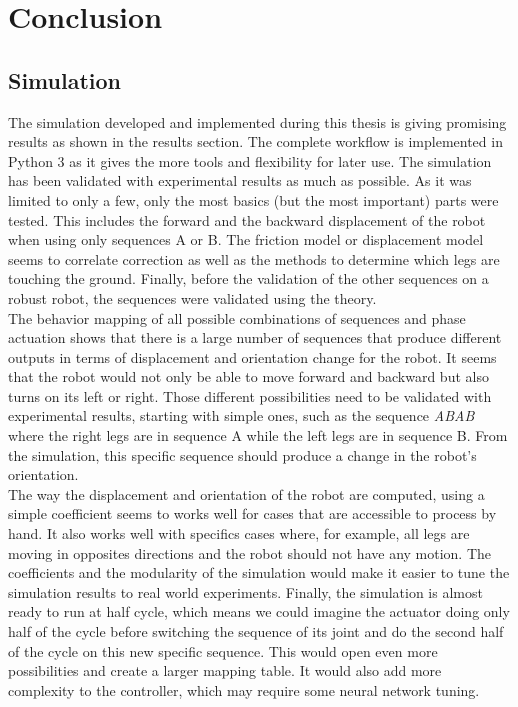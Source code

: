 \chapter{Conclusion}

\section{Simulation}
    The simulation developed and implemented during this thesis is giving promising results as shown in the results section. The complete workflow is implemented in Python 3 as it gives the more tools and flexibility for later use. The simulation has been validated with experimental results as much as possible. As it was limited to only a few, only the most basics (but the most important) parts were tested. This includes the forward and the backward displacement of the robot when using only sequences A or B. The friction model or displacement model seems to correlate correction as well as the methods to determine which legs are touching the ground. Finally, before the validation of the other sequences on a robust robot, the sequences were validated using the theory.\\
    
    The behavior mapping of all possible combinations of sequences and phase actuation shows that there is a large number of sequences that produce different outputs in terms of displacement and orientation change for the robot. It seems that the robot would not only be able to move forward and backward but also turns on its left or right. Those different possibilities need to be validated with experimental results, starting with simple ones, such as the sequence \textit{ABAB} where the right legs are in sequence A while the left legs are in sequence B. From the simulation, this specific sequence should produce a change in the robot's orientation.\\
    
    The way the displacement and orientation of the robot are computed, using a simple coefficient seems to works well for cases that are accessible to process by hand. It also works well with specifics cases where, for example, all legs are moving in opposites directions and the robot should not have any motion. The coefficients and the modularity of the simulation would make it easier to tune the simulation results to real world experiments. Finally, the simulation is almost ready to run at half cycle, which means we could imagine the actuator doing only half of the cycle before switching the sequence of its joint and do the second half of the cycle on this new specific sequence. This would open even more possibilities and create a larger mapping table. It would also add more complexity to the controller, which may require some neural network tuning.
    
